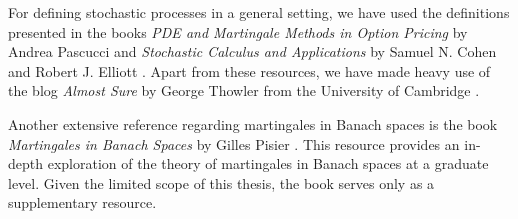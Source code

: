For defining stochastic processes in a general setting, we have used the definitions presented in the books \textit{PDE and Martingale Methods in Option Pricing} by Andrea Pascucci \cite{Pascucci_2011} and \textit{Stochastic Calculus and Applications} by Samuel N. Cohen and Robert J. Elliott \cite{Elliott_Cohen_1982}. Apart from these resources, we have made heavy use of the blog \textit{Almost Sure} by George Thowler from the University of Cambridge \cite{Thowler}.

Another extensive reference regarding martingales in Banach spaces is the book \textit{Martingales in Banach Spaces} by Gilles Pisier \cite{pisier_2016}. This resource provides an in-depth exploration of the theory of martingales in Banach spaces at a graduate level. Given the limited scope of this thesis, the book serves only as a supplementary resource.

